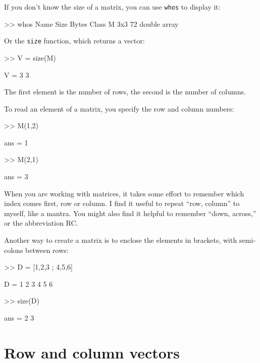 \documentclass[
]{book}
\numberwithin{Answer}{chapter}
\numberwithin{Exercise}{chapter}
\begin{document}
If you don't know the size of a matrix, you can use {\tt whos} to
display it:

\begin{code}
>> whos
  Name        Size                    Bytes  Class
  M           3x3                        72  double array
\end{code}

Or the {\tt size} function, which returns a vector:


\begin{code}
>> V = size(M)

V = 3     3
\end{code}

The first element is the number of rows, the second is the number of
columns.


To read an element of a matrix, you specify the row and column numbers:

\begin{code}
>> M(1,2)

ans = 1

>> M(2,1)

ans = 3
\end{code}

When you are working with matrices, it takes some effort to remember
which index comes first, row or column.  I find it useful to repeat
``row, column'' to myself, like a mantra.  You might also find it
helpful to remember ``down, across,'' or the abbreviation RC.

Another way to create a matrix is to enclose the elements in
brackets, with semi-colons between rows:

\begin{code}
>> D = [1,2,3 ; 4,5,6]

D =  1     2     3
     4     5     6

>> size(D)

ans = 2     3
\end{code}



\section{Row and column vectors}
\label{rowvector}

\end{document}
